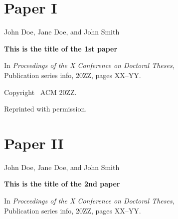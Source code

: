 \documentclass[officiallayout]{tktla}
\begin{document}
\chapter*{Paper I}\thispagestyle{empty}



\vspace{80pt}
John Doe, Jane Doe, and John Smith

\vspace{10pt}
\noindent\textbf{This is the title of the 1st paper}

\vspace{10pt}
\noindent In
\emph{Proceedings of the X Conference on Doctoral Theses}, 
\\Publication series info, 20ZZ, pages XX--YY.

\vspace{60pt}
\noindent Copyright \textcopyright\ ACM 20ZZ.

\noindent Reprinted with permission.

\cleardoublepage
%




\chapter*{Paper II}\thispagestyle{empty}


\vspace{80pt}

John Doe, Jane Doe, and John Smith

\vspace{10pt}
\noindent\textbf{This is the title of the 2nd paper}

\vspace{10pt}
\noindent In 
\emph{Proceedings of the X Conference on Doctoral Theses}, 
\\Publication series info, 20ZZ, pages XX--YY.
\end{document}
